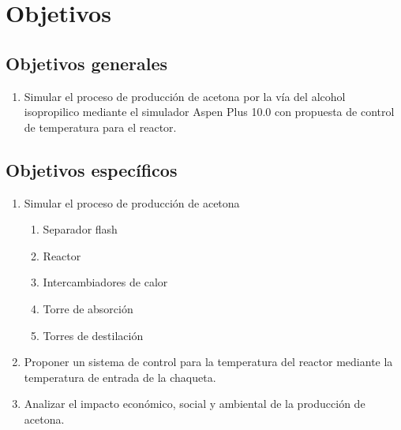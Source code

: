 \section*{Objetivos}
    \subsection*{Objetivos generales}

        \begin{enumerate}
            \item Simular el proceso de producción de acetona por la vía del alcohol isopropilico mediante el simulador Aspen Plus 10.0  con propuesta de control de temperatura  para el  reactor.
        \end{enumerate}

    \subsection*{Objetivos específicos}

        \begin{enumerate}
            \item Simular el proceso de producción de acetona
                \begin{enumerate}
                    \item Separador flash
                    \item Reactor
                    \item Intercambiadores de calor
                    \item Torre de absorción
                    \item Torres de destilación
                \end{enumerate}
            \item Proponer un sistema de control  para la temperatura del reactor mediante la temperatura de entrada de la chaqueta.
            \item Analizar el impacto económico, social y ambiental de la producción de acetona.
        \end{enumerate}